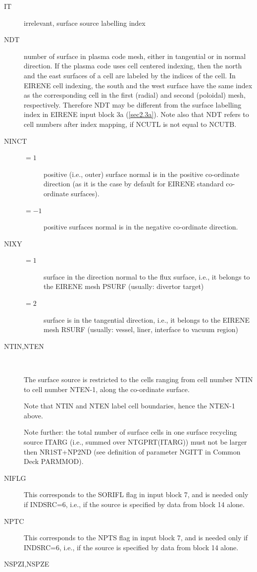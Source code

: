 \begin{description}
  \item[IT] irrelevant, surface source labelling index
  \item[NDT] number of
        surface in plasma code mesh, either in tangential or in normal direction.
        If the plasma code uses cell centered indexing, then the north and the east
        surfaces of a cell are labeled by the indices of the cell.
        In EIRENE cell indexing, the south and the west surface have the same index as
        the corresponding cell in the first (radial) and second (poloidal) mesh,
        respectively.
        Therefore NDT may be different from the surface labelling index in EIRENE input
        block 3a (\cref{sec2.3a}).
        Note also that NDT refers to cell numbers after index mapping, if NCUTL is not
        equal to NCUTB.
  \item[NINCT]
        \begin{description}
          \item[$= 1$] positive (i.e., outer) surface
                normal is in the positive co-ordinate direction (as it is the case by default
                for EIRENE standard co-ordinate surfaces).
          \item[$= -1$] positive surfaces normal is in the negative co-ordinate
                direction.
        \end{description}
  \item[NIXY]
        \begin{description}
          \item[$= 1$] surface in the direction normal to
                the flux surface, i.e., it belongs to the  EIRENE mesh PSURF
                (usually: divertor target)
          \item[$= 2$] surface is in the tangential direction,
                i.e., it belongs to the  EIRENE mesh RSURF (usually: vessel,
                liner, interface to vacuum region)
        \end{description}
  \item[NTIN,NTEN] ~

        The surface source is restricted to the cells ranging from cell number NTIN to
        cell number NTEN-1, along the co-ordinate surface.

        Note that NTIN and NTEN label cell boundaries, hence the NTEN-1 above.

        Note further: the total number of surface cells in one surface recycling source
        ITARG (i.e., summed over NTGPRT(ITARG)) must not be larger then NR1ST+NP2ND
        (see definition of parameter NGITT in Common Deck PARMMOD).
  \item[NIFLG] This corresponds to the SORIFL flag in input block 7, and is
        needed only if INDSRC=6, i.e., if the source is specified by data from block 14
        alone.
  \item[NPTC] This corresponds to the NPTS flag in input block 7, and is needed
        only if INDSRC=6, i.e., if the source is specified by data from block 14 alone.
  \item[NSPZI,NSPZE] ~ 


\end{description}
